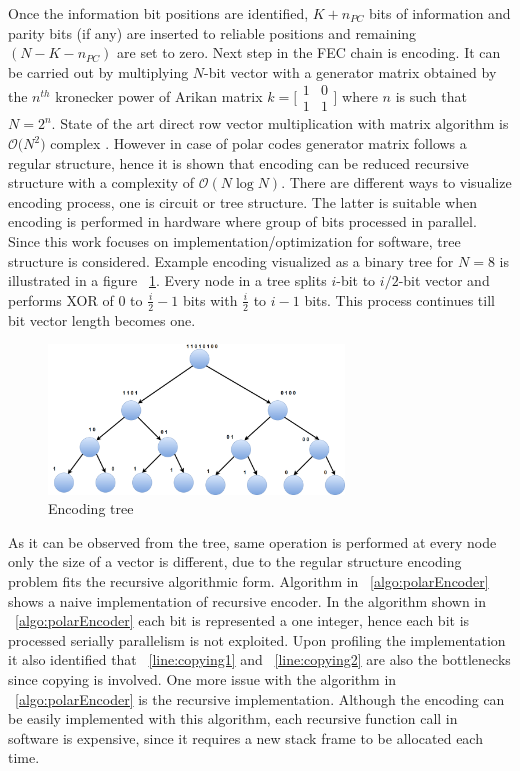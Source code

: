 Once the information bit positions are identified, $K + n_{PC}$ bits of information and parity bits (if any) are inserted to reliable positions and remaining  $(N-K-n_{PC})$ are set to zero. Next step in the FEC chain is encoding. It can be carried out by multiplying $N$-bit vector with a generator matrix obtained by the $n^{th}$ kronecker power of Arikan matrix $k = \big[\begin{smallmatrix} 1 & 0 \\ 1 & 1 \end{smallmatrix}$\big]  where $n$ is such that $N = 2^{n}$. State of the art direct row vector multiplication with matrix algorithm is $\mathcal{O}\big(N^{2}\big)$ complex \cite{MatrixMultComplexity}. However in case of polar codes generator matrix follows a regular structure, hence it is shown that encoding can be reduced recursive structure with a complexity of $\mathcal{O}(N\log{}N)$.  There are different ways to visualize encoding process, one is circuit or tree structure. The latter is suitable when encoding is performed in hardware where group of bits processed in parallel. Since this work focuses on implementation/optimization for software, tree structure is considered. Example encoding visualized as a binary tree for $N = 8$ is illustrated in a figure ~\ref{fig:treeEncoding}. Every node in a tree splits $i$-bit to $i/2$-bit vector and performs XOR of $0$ to $\frac{i}{2}-1$ bits with $\frac{i}{2}$ to $i-1$ bits. This process continues till bit vector length becomes one.

\begin{figure}[]
	\centering
	\includegraphics[width=0.7\textwidth]{./figures/treeEncoding.pdf}
	\caption{Encoding tree}
	\label{fig:treeEncoding}
\end{figure}

As it can be observed from the tree, same operation is performed at every node only the size of a vector is different, due to the regular structure encoding problem fits the recursive algorithmic form. Algorithm in ~\ref{algo:polarEncoder} shows a naive implementation of recursive encoder. In the algorithm shown in ~\ref{algo:polarEncoder} each bit is represented a one integer, hence each bit is processed serially parallelism is not exploited. Upon profiling the implementation it also identified that ~\ref{line:copying1} and ~\ref{line:copying2} are also the bottlenecks since copying is involved. One more issue with the algorithm in ~\ref{algo:polarEncoder} is the recursive implementation. Although the encoding can be easily implemented with this algorithm, each recursive function call in software is expensive, since it requires a new stack frame to be allocated each time.

